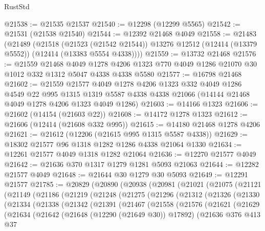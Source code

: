 \begin{lexlean}{RustStd}
\begin{coremodule}
@21538 := @21535 @21537
@21540 := @12298 (@12299 @5565)
@21542 := @21531 (@21538 @21540)
@21544 := @12392 @21468 @4049
@21558 := @21483
    (@21489
      (@21518
        (@21523 (@21542 @21544))
        @13276
        @12512
        (@12414 (@13379 @5552))
        (@12414 (@13383 @5554 @4338))))
@21559 := @13732 @21468
@21576 := @21559
    @21468
    @4049
    @1278
    @4206
    @1323
    @770
    @4049
    @1286
    @21070
    @30
    @1012
    @332
    @1312
    @5047
    @4338
    @4338
    @5580
@21577 := @16798 @21468
@21602 := @21559
    @21577
    @4049
    @1278
    @4206
    @1323
    @332
    @4049
    @1286
    @4549
    @22
    @995
    @1315
    @1319
    @5587
    @4338
    @4338
    @21066
    (@14144 @21468 @4049 @1278 @4206 @1323 @4049 @1286)
@21603 := @14166 @1323
@21606 := @21602 (@14154 (@21603 @22))
@21608 := @14172 @1278 @1323
@21612 := @21606 (@12414 (@21608 @332 @995))
@21615 := @14180 @21468 @1278 @4206
@21621 := @21612 (@12206 (@21615 @995 @1315 @5587 @4338))
@21629 := @18302 @21577 @96 @1318 @1282 @1286 @4338 @21064 @1330
@21634 := @12261 @21577 @4049 @1318 @1282 @21064
@21636 := @12270 @21577 @4049
@21642 := @21636 @370 @1317 @1279 @1281 @5093 @21063
@21644 := @12282 @21577 @4049
@21648 := @21644 @30 @1279 @30 @5093
@21649 := @12291 @21577
@21785 := @20829
    (@20890
      (@20938
        (@20981
          (@21021
            (@21075
              (@21121
                (@21149
                  (@21186
                    (@21219
                      (@21248
                        (@21275
                          (@21296
                            (@21312
                              (@21326
                                (@21330
                                  (@21334
                                    (@21338
                                      (@21342
                                        (@21391
                                          (@21467
                                            (@21558
                                              (@21576
                                                (@21621
                                                  (@21629
                                                    (@21634
                                                      (@21642
                                                        (@21648 (@12290 (@21649 @30)) @17892)
                                                        (@21636
                                                          @376
                                                          @413
                                                          @37

\end{coremodule}
\end{lexlean}
